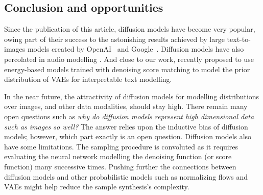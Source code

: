 \subsection{Conclusion and opportunities}
Since the publication of this article, diffusion models have become very popular, owing part of their success to the astonishing results achieved by large text-to-images models created by OpenAI~\citep[$\text{DALL}\cdot\text{E} 2$][]{ramesh2022hierarchical} and Google~\citep[Imagen][]{saharia2022photorealistic}. Diffusion models have also percolated in audio modelling \citep{kong2020diffwave}. And close to our work, \citet{yu2022latent} recently proposed to use energy-based models trained with denoising score matching to model the prior distribution of VAEs for interpretable text modelling.

In the near future, the attractivity of diffusion models for modelling distributions over images, and other data modalities, should stay high. There remain many open questions such as \textit{why do diffusion models represent high dimensional data such as images so well?} The answer relies upon the inductive bias of diffusion models; however, which part exactly is an open question. Diffusion models also have some limitations. The sampling procedure is convoluted as it requires evaluating the neural network modelling the denoising function (or score function) many successive times. Pushing further the connections between diffusion models and other probabilistic models such as normalizing flows and VAEs might help reduce the sample synthesis's complexity.

